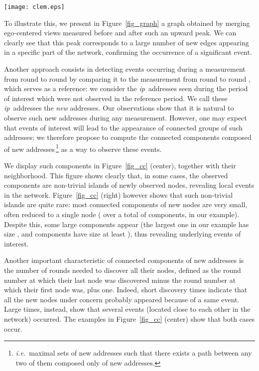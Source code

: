 \documentclass[times, 10pt,twocolumn]{article}
\newcommand{\ie}{{\em i.e.}}
\newcommand{\ip}{\mbox{\em \sc ip}}
\begin{document}
\begin{figure*}[!ht]
\begin{center}
\texttt{[image: clem.eps]}
\end{center}
\caption{Representation of the event at round 106231 in Figure~\ref{fig_events}:
the graph is obtained by merging 100 rounds before the event together with 
a single round after the event.
Edges in bold black are edges that were seen in the round after the event but not in the 
100 rounds before.
}
\label{fig_graph}
\end{figure*}

To illustrate this,
we present in Figure~\ref{fig_graph} a graph obtained by merging ego-centered
views measured before and after such an upward peak.
We can clearly see that this peak corresponds to a large number of new edges 
appearing in a specific part of the network,
confirming the occurrence of a significant event.


\medskip
Another approach consists in detecting
events occurring during a measurement from round  to round  by
comparing it to the measurement from round  to round , which
serves as a reference: we consider the \ip\ addresses seen during the
period of interest which were not observed in the reference period. We
call these \ip\ addresses the {\em new} addresses. 
Our observations show that it is natural to observe such new addresses
during any measurement.
However, one may expect
that events of interest will lead to the appearance of connected
groups of such addresses; we therefore propose to compute the
connected components composed of new addresses\,\footnote{\ie\ maximal
  sets of new addresses such that there exists a path between any two
  of them composed only of new addresses.} as a way to observe these
events.


We display such components in Figure~\ref{fig_cc} (center), together
with their neighborhood. This figure shows clearly that, in some
cases, the observed components are non-trivial islands of newly
observed nodes, revealing local events in the network. 
Figure~\ref{fig_cc} (right) however shows that such non-trivial islands are quite rare: most connected components of new nodes are very small, often reduced to a single node ( over a total of  components, in our example). Despite this, some large components appear (the largest one in our example has size , and  components have size at least ), thus revealing underlying events of interest.

Another important characteristic of connected components of new addresses is the number of rounds needed to discover all their nodes, defined as the round number at which their last node was discovered minus the round number at which their first node was, plus one. Indeed, short discovery times indicate that all the new nodes under concern probably appeared because of a same event. Large times, instead, show that several events (located close to each other in the network) occurred. The examples in Figure~\ref{fig_cc} (center) show that both cases occur.
\end{document}
